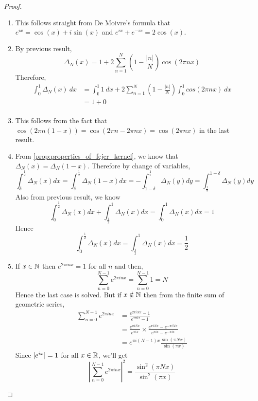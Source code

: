  \begin{proof}
    \begin{enumerate}[label=(\alph*)]
      \item
        This follows straight from De Moivre's formula that $e^{ix} = \cos(x) + i\sin(x)$ and $e^{ix} + e^{-ix}  = 2\cos(x)$.

      \item 
        By previous result,
          $$\Delta_N(x) = 1 + 2\sum_{n=1}^N \left(1-\frac{|n|}{N}\right)\cos(2\pi nx)$$
        Therefore, 
        \begin{align*}
          \int_0^1\Delta_N(x) \ dx &= \int_0^1 1\ dx + 2\sum_{n=1}^N \left(1 - \frac{|n|}{N}\right)\int_0^1cos(2\pi nx) \ dx \\
                &= 1 + 0 \\ 
        \end{align*}

      \item
        This follows from the fact that $\cos(2\pi n(1-x))  = \cos(2\pi n - 2\pi nx) = \cos(2\pi nx)$ in the last result.
      \item
        From \autoref{prop:properties_of_fejer_kernel}, we know that $\Delta_N(x) = \Delta_N(1-x)$. Therefore by change of variables,
        \begin{displaymath}
          \int_\delta^{\frac{1}{2}}\Delta_N(x) dx = \int_\delta^{\frac{1}{2}}\Delta_N(1-x)dx = -\int_{1-\delta}^{\frac{1}{2}} \Delta_N(y)dy = \int_{\frac{1}{2}}^{1 - \delta}\Delta_N(y) dy
        \end{displaymath}
        Also from previous result, we know
        $$\int_0^{\frac{1}{2}}\Delta_N(x) dx + \int_{\frac{1}{2}}^1\Delta_N(x) dx = \int_0^1\Delta_N(x) dx = 1$$
        Hence $$\int_0^{\frac{1}{2}} \Delta_N(x) dx = \int_{\frac{1}{2}}^1 \Delta_N(x) dx = \frac{1}{2}$$

      \item
        If $x\in \mathbb N$ then $e^{2\pi inx} = 1$ for all $n$ and then,
        \begin{displaymath}
          \sum_{n=0}^{N-1}e^{2\pi inx} = \sum_{n=0}^{N-1} 1 = N
        \end{displaymath}
        Hence the last case is solved. But if $x\notin \mathbb N$ then from the finite sum of geometric series,
        \begin{align*}
          \sum_{n=0}^{N-1}e^{2\pi inx} &= \frac{e^{2\pi iNx} - 1}{e^{2\pi ix} - 1} \\
                  & = \frac{e^{\pi iNx}}{e^{\pi ix}} \times \frac{e^{\pi iNx} - e^{-\pi iNx}}{e^{\pi ix} - e^{-\pi ix}} \\
                  & = e^{\pi i(N-1)x}\frac{\sin(\pi Nx)}{\sin(\pi x)}
        \end{align*}
        Since $\lvert e^{ix}\rvert = 1$ for all $x\in \mathbb R$, we'll get
        \begin{displaymath}
          \left|\sum_{n=0}^{N-1}e^{2 \pi inx}\right|^2 = \frac{\sin^2(\pi Nx)}{\sin^2(\pi x)}  
        \end{displaymath}


\end{enumerate}
\end{proof}
